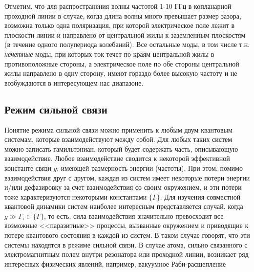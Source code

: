 Отметим, что для распространения волны частотой 1-10 ГГц в копланарной проходной линии в случае, когда длина волны много превышает размер зазора, возможна только одна поляризация, при которой электрическое поле лежит в плоскости линии и направлено от центральной жилы к заземленным плоскостям (в течение одного полупериода колебаний). Все остальные моды, в том числе т.н. \textit{нечетные} моды, при которых ток течет по краям центральной жилы в противоположные стороны, а электрическое поле по обе стороны центральной жилы направлено в одну сторону, имеют гораздо более высокую частоту и не возбуждаются в интересующем нас диапазоне.   

\subsection{Режим сильной связи}
Понятие режима сильной связи можно применить к любым двум квантовым системам, которые взаимодействуют между собой. Для любых таких систем можно записать гамильтониан, который будет содержать часть, описывающую взаимодействие. Любое взаимодействие сводится к некоторой эффективной константе связи $g$, имеющей размерность энергии (частоты). При этом, помимо взаимодействия друг с другом, каждая из систем имеет некоторые потери энергии и/или дефазировку за счет взаимодействия со своим окружением, и эти потери тоже характеризуются некоторыми константами $\{\Gamma\}$. Для изучения совместной квантовой динамики систем наиболее интересным представляется случай, когда $g \gg \Gamma_i \in \{\Gamma\}$, то есть, сила взаимодействия значительно превосходит все возможные <<паразитные>> процессы, вызванные окружением и приводящие к потере квантового состояния в каждой из систем. В таком случае говорят, что эти системы находятся в режиме сильной связи. В случае атома, сильно связанного с электромагнитным полем внутри резонатора или проходной линии, возникает ряд интересных физических явлений, например, вакуумное Раби-расщепление 

